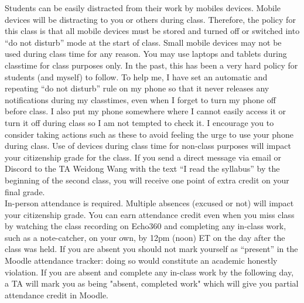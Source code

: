 \documentclass[10pt]{article}
\begin{document}
Students can be easily distracted from their work by mobiles devices. Mobile devices will be distracting to you or others during class. Therefore, the policy for this class is that all mobile devices must be stored and turned off or switched into ``do not disturb'' mode at the start of class. Small mobile devices may not be used during class time for any reason. %
You may use laptops and tablets during classtime for class purposes only. In the past, this has been a very hard policy for students (and myself) to follow. To help me, I have set an automatic and repeating ``do not disturb'' rule on my phone so that it never releases any notifications during my classtimes, even when I forget to turn my phone off before class. I also put my phone somewhere where I cannot easily access it or turn it off during class so I am not tempted to check it. I encourage you to consider taking actions such as these to avoid feeling the urge to use your phone during class.
Use of devices during class time for non-class purposes will impact your citizenship grade for the class.
If you send a direct message via email or Discord to the TA Weidong Wang with the text ``I read the syllabus'' by the beginning of the second class, you will receive one point of extra credit on your final grade. \\


 In-person attendance is required. Multiple absences (excused or not) will impact your citizenship grade. You can earn attendance credit even when you miss class by watching the class recording on Echo360 and completing any in-class work, such as a note-catcher, on your own, by 12pm (noon) ET on the day after the class was held. If you are absent you should not mark yourself as ``present'' in the Moodle attendance tracker: doing so would constitute an academic honestly violation. If you are absent and complete any in-class work by the following day, a TA will mark you as being "absent, completed work" which will give you partial attendance credit in Moodle. \\
\end{document}
